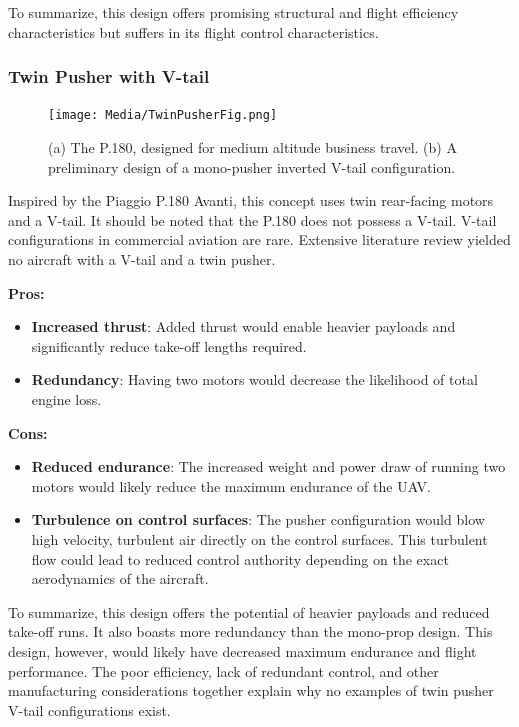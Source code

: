 \documentclass[12pt]{article}
\begin{document}
	To summarize, this design offers promising structural and flight efficiency characteristics but suffers in its flight control characteristics.
	
	\newpage
	
	\subsubsection{Twin Pusher with V-tail}
	\begin{figure}[h!]
		\centering
		\texttt{[image: Media/TwinPusherFig.png]} %
		\caption{(a) The P.180, designed for medium altitude business travel. (b) A preliminary design of a mono-pusher inverted V-tail configuration.}
	\end{figure}
	Inspired by the Piaggio P.180 Avanti, this concept uses twin rear-facing motors and a V-tail. It should be noted that the P.180 does not possess a V-tail. V-tail configurations in commercial aviation are rare. Extensive literature review yielded no aircraft with a V-tail and a twin pusher. 
	
	\textbf{Pros:}
	\begin{itemize}
		\item \textbf{Increased thrust}: Added thrust would enable heavier payloads and significantly reduce take-off lengths required.
		\item \textbf{Redundancy}: Having two motors would decrease the likelihood of total engine loss.
	\end{itemize}
	
	\textbf{Cons:}
	\begin{itemize}
		\item \textbf{Reduced endurance}: The increased weight and power draw of running two motors would likely reduce the maximum endurance of the UAV.
		\item \textbf{Turbulence on control surfaces}: The pusher configuration would blow high velocity, turbulent air directly on the control surfaces. This turbulent flow could lead to reduced control authority depending on the exact aerodynamics of the aircraft.
	\end{itemize}
	
	To summarize, this design offers the potential of heavier payloads and reduced take-off runs. It also boasts more redundancy than the mono-prop design. This design, however, would likely have decreased maximum endurance and flight performance. The poor efficiency, lack of redundant control, and other manufacturing considerations together explain why no examples of twin pusher V-tail configurations exist.
	
\end{document}
